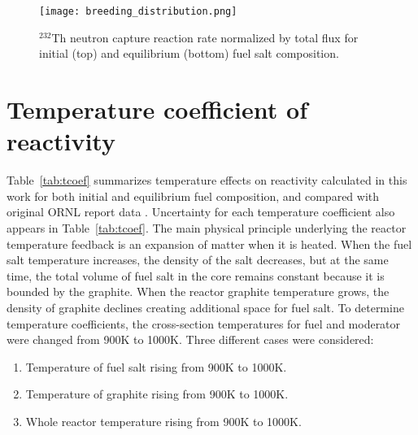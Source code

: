 \begin{figure}[htp!] %
  \centering
    \vspace{-0.3em}
  \texttt{[image: breeding\_distribution.png]} 
  \caption{$^{232}$Th neutron capture reaction rate normalized by total flux for initial (top) and equilibrium (bottom) fuel salt composition.}
    \vspace{-0.6em}
  \label{fig:breeding_den}
\end{figure}
\FloatBarrier

\section{Temperature coefficient of reactivity}
Table~\ref{tab:tcoef} summarizes temperature effects on reactivity calculated in this work for both initial and equilibrium fuel composition, and compared with original \gls{ORNL} report data \cite{robertson_conceptual_1971}. Uncertainty for each temperature coefficient also appears in Table~\ref{tab:tcoef}. The main physical principle underlying the reactor temperature feedback is an expansion of matter when it is heated. When the fuel salt temperature increases, the density of the salt decreases, but at the same time, the total volume of fuel salt in the core remains constant because it is bounded by the graphite. When the reactor graphite temperature grows, the density of graphite declines creating additional space for fuel salt. To determine temperature coefficients, the cross-section temperatures for fuel and moderator were changed from 900K to 1000K. Three different cases were considered:
\begin{enumerate}
  \item Temperature of fuel salt rising from 900K to 1000K.
  \item Temperature of graphite rising from 900K to 1000K.
  \item Whole reactor temperature rising from 900K to 1000K.
\end{enumerate}

